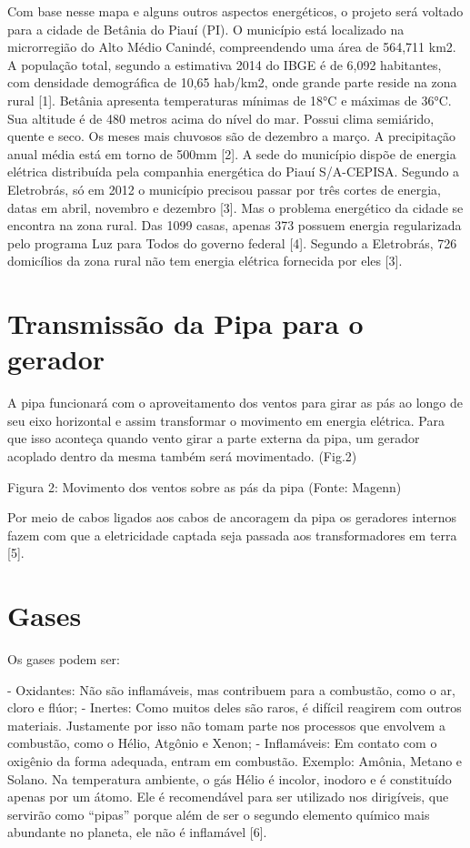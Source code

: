 Com base nesse mapa e alguns outros aspectos energéticos, o projeto será voltado para a cidade de Betânia do Piauí (PI).
O município está localizado na microrregião do Alto Médio Canindé, compreendendo uma área de 564,711 km2. A população total, segundo a estimativa 2014 do IBGE é de 6,092 habitantes, com densidade demográfica de 10,65 hab/km2, onde grande parte reside na zona rural [1].
Betânia apresenta temperaturas mínimas de 18°C e máximas de 36°C. Sua altitude é de 480 metros acima do nível do mar. Possui clima semiárido, quente e seco. Os meses mais chuvosos são de dezembro a março. A precipitação anual média está em torno de 500mm [2]. 
A sede do município dispõe de energia elétrica distribuída pela companhia energética do Piauí S/A-CEPISA. Segundo a Eletrobrás, só em 2012 o município precisou passar por três cortes de energia, datas em abril, novembro e dezembro [3].
Mas o problema energético da cidade se encontra na zona rural. Das 1099 casas, apenas 373 possuem energia regularizada pelo programa Luz para Todos do governo federal [4]. Segundo a Eletrobrás, 726 domicílios da zona rural não tem energia elétrica fornecida por eles [3].

\section{Transmissão da Pipa para o gerador}
 
A pipa funcionará com o aproveitamento dos ventos para girar as pás ao longo de seu eixo horizontal e assim transformar o movimento em energia elétrica.  Para que isso aconteça quando vento girar a parte externa da pipa, um gerador acoplado dentro da mesma também será movimentado. (Fig.2)

Figura 2: Movimento dos ventos sobre as pás da pipa
(Fonte: Magenn)

Por meio de cabos ligados aos cabos de ancoragem da pipa os geradores internos fazem com que a eletricidade captada seja passada aos transformadores em terra [5].


\section{Gases}

Os gases podem ser:

- Oxidantes: Não são inflamáveis, mas contribuem para a combustão, como o ar, cloro e flúor;
- Inertes: Como muitos deles são raros, é difícil reagirem com outros materiais. Justamente por isso não tomam parte nos processos que envolvem a combustão, como o Hélio, Atgônio e Xenon;
- Inflamáveis: Em contato com o oxigênio da forma adequada, entram em combustão. Exemplo: Amônia, Metano e Solano.
Na temperatura ambiente, o gás Hélio é incolor, inodoro e é constituído apenas por um átomo. Ele é recomendável para ser utilizado nos dirigíveis, que servirão como “pipas” porque além de ser o segundo elemento químico mais abundante no planeta, ele não é inflamável [6].

